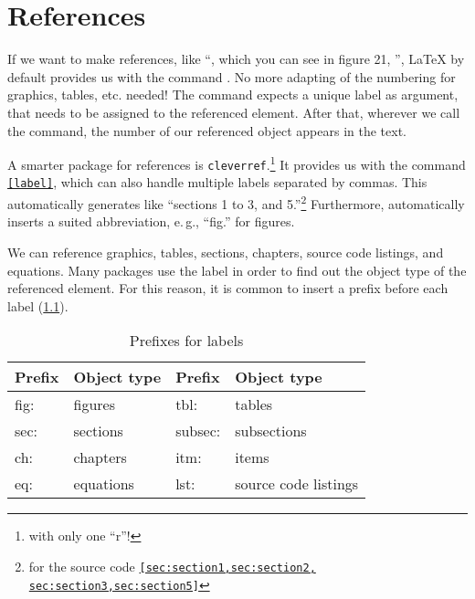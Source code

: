 \chapter{References}
\label{sec:references}

If we want to make references, like \enquote{\textellipsis , which you can see in figure 21, \textellipsis}, \LaTeX{} by default provides us with the command \replaced[id=F]{\texttt{\ref{<label>}}}{\texttt{\ref{label}}}. No more adapting of the numbering for graphics, tables, etc. needed!
The command expects a unique label as argument, that needs to be assigned to 
the referenced element. After that, wherever we call the command, the number of 
our referenced object appears in the text.

A smarter package for references is \texttt{cleverref}.\footnote{with only one \enquote{r}!}
It provides us with the command \texttt{\cref{label}}, which can also handle multiple labels separated by commas.
This automatically generates  like \enquote{sections 1 to 3, and 5.}\footnote{for the source code \texttt{\cref{sec:section1,sec:section2,
sec:section3,sec:section5}}}
Furthermore, \replaced[id=F]{\texttt{\ref{<label>}}}{\texttt{\ref{label}}} automatically inserts a suited abbreviation, e.\,g., \enquote{fig.} for figures.

We can reference graphics, tables, sections, chapters, source code listings, and equations. 
Many packages use the label in order to find out the object type of the referenced element.
For this reason, it is common to insert a prefix before each label (\cref{lst:reference-prefixes}).

\begin{table}[H]
  \centering
  \begin{tabular}{@{}llll@{}}
    \toprule
    Prefix & Object type & Prefix & Object type \\ \midrule
    fig: & figures & tbl:    & tables            \\ 
    sec: & sections  & subsec: & subsections     \\
    ch:  & chapters     & itm:    & items \\
    eq:  & equations & lst:    & source code listings  \\ \bottomrule
  \end{tabular}
  \caption{Prefixes for labels}
  \label{lst:reference-prefixes}
\end{table}

